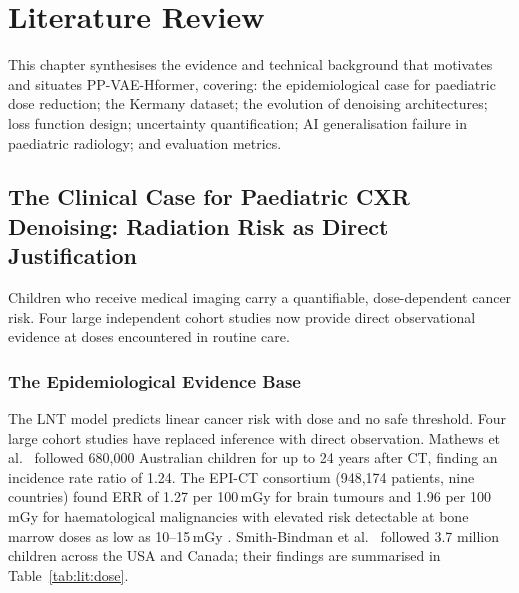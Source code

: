 \documentclass[12pt, a4paper, twoside, openright]{book}
\begin{document}
\chapter{Literature Review}
\label{chap:lit}

This chapter synthesises the evidence and technical background that motivates and situates PP-VAE-Hformer, covering: the epidemiological case for paediatric dose reduction; the Kermany dataset; the evolution of denoising architectures; loss function design; uncertainty quantification; AI generalisation failure in paediatric radiology; and evaluation metrics.

\section{The Clinical Case for Paediatric CXR Denoising: Radiation Risk as Direct Justification}
\label{sec:lit:radiation}

Children who receive medical imaging carry a quantifiable, dose-dependent cancer risk. Four large independent cohort studies now provide direct observational evidence at doses encountered in routine care.

\subsection{The Epidemiological Evidence Base}
\label{sec:lit:radiation:evidence}

The LNT model \cite{international_commission_on_radiological_protection_2007_2007, national_research_council_health_2006} predicts linear cancer risk with dose and no safe threshold. Four large cohort studies have replaced inference with direct observation. Mathews et al.\ \cite{mathews_cancer_2013} followed 680,000 Australian children for up to 24 years after CT, finding an incidence rate ratio of 1.24. The EPI-CT consortium (948,174 patients, nine countries) found ERR of 1.27 per 100\,mGy for brain tumours \cite{hauptmann_brain_2023} and 1.96 per 100\,mGy for haematological malignancies with elevated risk detectable at bone marrow doses as low as 10--15\,mGy \cite{bosch_de_basea_gomez_risk_2023}. Smith-Bindman et al.\ \cite{smith-bindman_hematologic_2025} followed 3.7 million children across the USA and Canada; their findings are summarised in Table~\ref{tab:lit:dose}.
\end{document}
